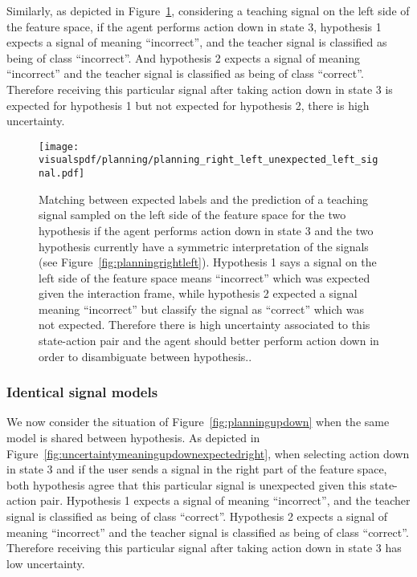 Similarly, as depicted in Figure~\ref{fig:uncertaintymeaningrightleftunexpectedleft}, considering a teaching signal on the left side of the feature space, if the agent performs action down in state 3, hypothesis 1 expects a signal of meaning ``incorrect'', and the teacher signal is classified as being of class ``incorrect''. And hypothesis 2 expects a signal of meaning ``incorrect'' and the teacher signal is classified as being of class ``correct''. Therefore receiving this particular signal after taking action down in state 3 is expected for hypothesis 1 but not expected for hypothesis 2, there is high uncertainty.

\begin{figure}[!htbp]
  \centering
  \texttt{[image: \\visualspdf/planning/planning\_right\_left\_unexpected\_left\_signal.pdf]}
  \caption{Matching between expected labels and the prediction of a teaching signal sampled on the left side of the feature space for the two hypothesis if the agent performs action down in state 3 and the two hypothesis currently have a symmetric interpretation of the signals (see Figure~\ref{fig:planningrightleft}). Hypothesis 1 says a signal on the left side of the feature space means ``incorrect'' which was expected given the interaction frame, while hypothesis 2 expected a signal meaning ``incorrect'' but classify the signal as ``correct'' which was not expected. Therefore there is high uncertainty associated to this state-action pair and the agent should better perform action down in order to disambiguate between hypothesis..}
  \label{fig:uncertaintymeaningrightleftunexpectedleft}
\end{figure}

\subsubsection*{Identical signal models}

We now consider the situation of Figure~\ref{fig:planningupdown} when the same model is shared between hypothesis. As depicted in Figure~\ref{fig:uncertaintymeaningupdownexpectedright}, when selecting action down in state 3 and if the user sends a signal in the right part of the feature space, both hypothesis agree that this particular signal is unexpected given this state-action pair. Hypothesis 1 expects a signal of meaning ``incorrect'', and the teacher signal is classified as being of class ``correct''. Hypothesis 2 expects a signal of meaning ``incorrect'' and the teacher signal is classified as being of class ``correct''. Therefore receiving this particular signal after taking action down in state 3 has low uncertainty.

